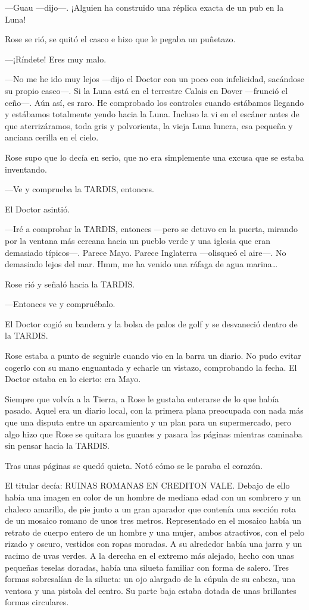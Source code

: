 ---Guau ---dijo---. ¡Alguien ha construido una réplica exacta de un pub en
la Luna!

Rose se rió, se quitó el casco e hizo que le pegaba un puñetazo.

---¡Ríndete! Eres muy malo.

---No me he ido muy lejos ---dijo el Doctor con un poco con infelicidad,
sacándose su propio casco---. Si la Luna está en el terrestre Calais en
Dover ---frunció el ceño---. Aún así, es raro. He comprobado los
controles cuando estábamos llegando y estábamos totalmente yendo hacia
la Luna. Incluso la vi en el escáner antes de que aterrizáramos, toda
gris y polvorienta, la vieja Luna lunera, esa pequeña y anciana cerilla
en el cielo.

Rose supo que lo decía en serio, que no era simplemente una excusa que
se estaba inventando.

---Ve y comprueba la TARDIS, entonces.

El Doctor asintió.

---Iré a comprobar la TARDIS, entonces ---pero se detuvo en la puerta,
mirando por la ventana más cercana hacia un pueblo verde y una iglesia
que eran demasiado típicos---. Parece Mayo. Parece Inglaterra ---olisqueó
el aire---. No demasiado lejos del mar. Hmm, me ha venido una ráfaga de
agua marina\ldots{}

Rose rió y señaló hacia la TARDIS.

---Entonces ve y compruébalo.

El Doctor cogió su bandera y la bolsa de palos de golf y se desvaneció
dentro de la TARDIS.

Rose estaba a punto de seguirle cuando vio en la barra un diario. No
pudo evitar cogerlo con su mano enguantada y echarle un vistazo,
comprobando la fecha. El Doctor estaba en lo cierto: era Mayo.

Siempre que volvía a la Tierra, a Rose le gustaba enterarse de lo que
había pasado. Aquel era un diario local, con la primera plana preocupada
con nada más que una disputa entre un aparcamiento y un plan para un
supermercado, pero algo hizo que Rose se quitara los guantes y pasara
las páginas mientras caminaba sin pensar hacia la TARDIS.

Tras unas páginas se quedó quieta. Notó cómo se le paraba el corazón.

El titular decía: RUINAS ROMANAS EN CREDITON VALE. Debajo de ello había
una imagen en color de un hombre de mediana edad con un sombrero y un
chaleco amarillo, de pie junto a un gran aparador que contenía una
sección rota de un mosaico romano de unos tres metros. Representado en
el mosaico había un retrato de cuerpo entero de un hombre y una mujer,
ambos atractivos, con el pelo rizado y oscuro, vestidos con ropas
moradas. A su alrededor había una jarra y un racimo de uvas verdes. A la
derecha en el extremo más alejado, hecho con unas pequeñas teselas
doradas, había una silueta familiar con forma de salero. Tres formas
sobresalían de la silueta: un ojo alargado de la cúpula de su cabeza,
una ventosa y una pistola del centro. Su parte baja estaba dotada de
unas brillantes formas circulares.

